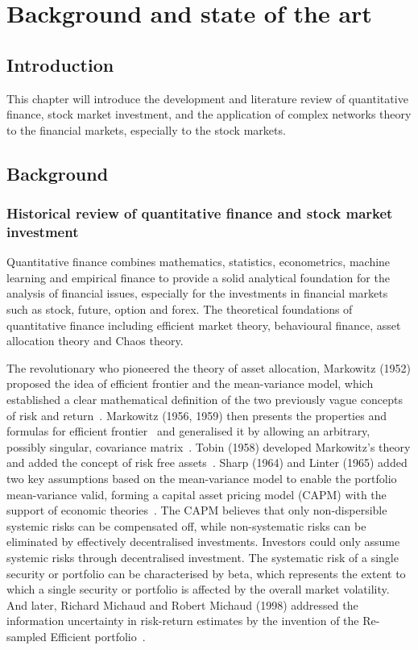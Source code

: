\chapter[Background]{Background and state of the art}
\label{cpt:back}

\section{Introduction}
This chapter will introduce the development and literature review of quantitative finance, stock market investment, and the application of complex networks theory to the financial markets, especially to the stock markets.

\section{Background}
\subsection{Historical review of quantitative finance and stock market investment}
Quantitative finance combines mathematics, statistics, econometrics, machine learning and empirical finance to provide a solid analytical foundation for the analysis of financial issues, especially for the investments in financial markets such as stock, future, option and forex. The theoretical foundations of quantitative finance including efficient market theory, behavioural finance, asset allocation theory and Chaos theory.

The revolutionary who pioneered the theory of asset allocation, Markowitz (1952) proposed the idea of efficient frontier and the mean-variance model, which established a clear mathematical definition of the two previously vague concepts of risk and return~\cite{portfolio}. Markowitz (1956, 1959) then presents the properties and formulas for efficient frontier~\cite{markowitz1956optimization} and generalised it by allowing an arbitrary, possibly singular, covariance matrix~\cite{markowitz1959portfolio}. Tobin (1958) developed Markowitz's theory and added the concept of risk free assets~\cite{tobin1958liquidity}. Sharp (1964) and Linter (1965) added two key assumptions based on the mean-variance model to enable the portfolio mean-variance valid, forming a capital asset pricing model (CAPM) with the support of economic theories~\cite{equilibrium, diversification}. The CAPM believes that only non-dispersible systemic risks can be compensated off, while non-systematic risks can be eliminated by effectively decentralised investments. Investors could only assume systemic risks through decentralised investment. The systematic risk of a single security or portfolio can be characterised by beta, which represents the extent to which a single security or portfolio is affected by the overall market volatility. And later, Richard Michaud and Robert Michaud (1998) addressed the information uncertainty in risk-return estimates by the invention of the Re-sampled Efficient portfolio~\cite{michaud1998asset}.

